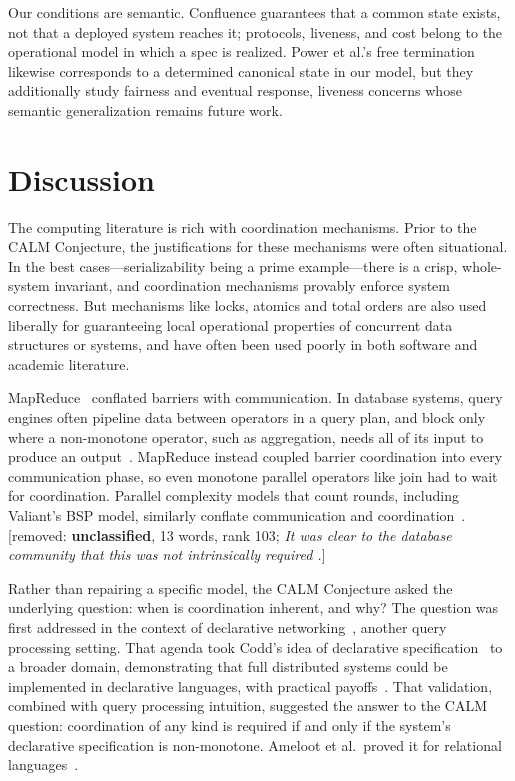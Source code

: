 \documentclass[sigconf]{cidr-2027}
\theoremstyle{remark}
\newcommand{\removednote}[1]{{\color{cutred}\footnotesize\,[removed: #1]\,}}
\begin{document}
\textcolor{newblue}{Our conditions are semantic.} \textcolor{newblue}{Confluence guarantees that
a common state exists, not that a deployed system reaches it; protocols,
liveness, and cost belong to the operational model in which a spec
is realized.} \textcolor{newblue}{Power et al.'s free termination~\cite{power2025freetermination}
likewise corresponds to a determined canonical state in our model, but they
additionally study fairness and eventual response, liveness concerns whose
semantic generalization remains future work.}


\section{Discussion}
\label{sec:discussion}

The computing literature is rich with coordination mechanisms. Prior to the CALM
Conjecture, the justifications for these mechanisms were often situational. In the best cases---serializability being a prime example---there is a crisp,
whole-system invariant, and coordination mechanisms provably enforce system
correctness. \textcolor{newblue}{But mechanisms like locks, atomics and total orders are also used
liberally for guaranteeing local operational properties of concurrent data
structures or systems, and have often been used poorly in both software and
academic literature.}

MapReduce~\cite{dean2004mapreduce} conflated barriers with communication. \textcolor{newblue}{In database systems, query
engines often pipeline data between operators in a query plan, and block only
where a non-monotone operator, such as aggregation, needs all of its input to
produce an output~\cite{wilschut1991dataflow,graefe1990volcano}.} \textcolor{newblue}{MapReduce
instead coupled barrier coordination into every communication phase,
so even monotone parallel operators like join had to wait for coordination.} Parallel complexity models that count rounds, including Valiant's BSP model,
similarly conflate communication and
coordination~\cite{valiant1990bsp,karloff2010mrc}. \removednote{\textbf{unclassified}, 13 words, rank 103; \textit{It was clear to the database community that this was not intrinsically required .}}

Rather than repairing a specific model, the CALM Conjecture asked the underlying
question: when is coordination inherent, and why? The question was
first addressed in the context of declarative
networking~\cite{loo2009declarative}, another query processing setting. \textcolor{newblue}{That
agenda took Codd's idea of declarative
specification~\cite{codd1970relational} to a broader domain,
demonstrating that full distributed systems could be implemented in declarative
languages, with practical
payoffs~\cite{loo2005overlays,loo2009declarative,chu2007declarative,alvaro2010boom,alvaro2011bloom}.} \textcolor{newblue}{That validation, combined with query processing intuition, suggested the answer
to the CALM question: coordination of any kind is required if and only if the
system's declarative specification is non-monotone.} Ameloot et al.\ proved it
for relational languages~\cite{ameloot2013relational}.
\end{document}
